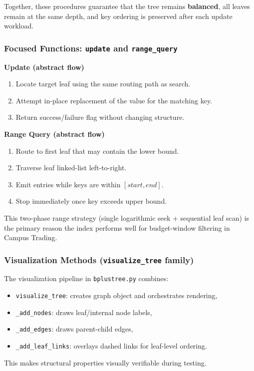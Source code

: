 \documentclass[12pt, a4paper]{article}
\begin{document}
Together, these procedures guarantee that the tree remains \textbf{balanced}, all leaves remain at the same depth, and key ordering is preserved after each update workload.

\subsubsection{Focused Functions: \texttt{update} and \texttt{range\_query}}
\textbf{Update (abstract flow)}
\begin{enumerate}
    \item Locate target leaf using the same routing path as search.
    \item Attempt in-place replacement of the value for the matching key.
    \item Return success/failure flag without changing structure.
\end{enumerate}

\textbf{Range Query (abstract flow)}
\begin{enumerate}
    \item Route to first leaf that may contain the lower bound.
    \item Traverse leaf linked-list left-to-right.
    \item Emit entries while keys are within \([start, end]\).
    \item Stop immediately once key exceeds upper bound.
\end{enumerate}

This two-phase range strategy (single logarithmic seek + sequential leaf scan) is the primary reason the index performs well for budget-window filtering in Campus Trading.

\subsubsection{Visualization Methods (\texttt{visualize\_tree} family)}
The visualization pipeline in \texttt{bplustree.py} combines:
\begin{itemize}
    \item \texttt{visualize\_tree}: creates graph object and orchestrates rendering,
    \item \texttt{\_add\_nodes}: draws leaf/internal node labels,
    \item \texttt{\_add\_edges}: draws parent-child edges,
    \item \texttt{\_add\_leaf\_links}: overlays dashed links for leaf-level ordering.
\end{itemize}
This makes structural properties visually verifiable during testing.
\end{document}
